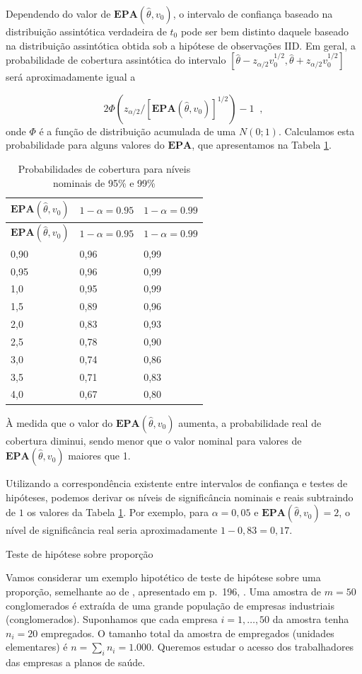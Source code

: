 \documentclass[]{book}
\theoremstyle{definition}
\theoremstyle{definition}
\theoremstyle{definition}
\theoremstyle{remark}
\let\BeginKnitrBlock\begin \let\EndKnitrBlock\end
\begin{document}
Dependendo do valor de \(\mathbf{EPA}\left( \hat{\theta},v_{0}\right)\),
o intervalo de confiança baseado na distribuição assintótica verdadeira
de \(t_{0}\) pode ser bem distinto daquele baseado na distribuição
assintótica obtida sob a hipótese de observações IID. Em geral, a
probabilidade de cobertura assintótica do intervalo
\(\left[\hat{\theta}-z_{\alpha /2}v_{0}^{1/2}, \hat{\theta}+z_{\alpha/2}v_{0}^{1/2}\right]\)
será aproximadamente igual a

\[
2\Phi \left( z_{\alpha /2}/\left[ \mathbf{EPA}\left( \hat{\theta}
,v_{0}\right) \right] ^{1/2}\right) -1\;\;, 
\] onde \(\Phi\) é a função de distribuição acumulada de uma
\(N\left( 0;1\right)\). Calculamos esta probabilidade para alguns
valores do \(\mathbf{EPA}\), que apresentamos na Tabela
\ref{tab:procob}.

\begin{longtable}[]{@{}lll@{}}
\caption{\label{tab:procob} Probabilidades de cobertura para níveis nominais
de 95\% e 99\%}\tabularnewline
\toprule
\(\mathbf{EPA}\left( \hat{\theta},v_{0}\right)\) & \(1-\alpha=0.95\) &
\(1-\alpha=0.99\)\tabularnewline
\midrule
\endfirsthead
\toprule
\(\mathbf{EPA}\left( \hat{\theta},v_{0}\right)\) & \(1-\alpha=0.95\) &
\(1-\alpha=0.99\)\tabularnewline
\midrule
\endhead
0,90 & 0,96 & 0,99\tabularnewline
0,95 & 0,96 & 0,99\tabularnewline
1,0 & 0,95 & 0,99\tabularnewline
1,5 & 0,89 & 0,96\tabularnewline
2,0 & 0,83 & 0,93\tabularnewline
2,5 & 0,78 & 0,90\tabularnewline
3,0 & 0,74 & 0,86\tabularnewline
3,5 & 0,71 & 0,83\tabularnewline
4,0 & 0,67 & 0,80\tabularnewline
\bottomrule
\end{longtable}

À medida que o valor do \(\mathbf{EPA}\left( \hat{\theta},v_{0}\right)\)
aumenta, a probabilidade real de cobertura diminui, sendo menor que o
valor nominal para valores de
\(\mathbf{EPA}\left( \hat{\theta},v_{0}\right)\) maiores que 1.

Utilizando a correspondência existente entre intervalos de confiança e
testes de hipóteses, podemos derivar os níveis de significância nominais
e reais subtraindo de \(1\) os valores da Tabela \ref{tab:procob}. Por
exemplo, para \(\alpha =0,05\) e
\(\mathbf{EPA}\left( \hat{\theta},v_{0}\right) =2\), o nível de
significância real seria aproximadamente \(1-0,83=0,17\).

\BeginKnitrBlock{example}
\protect\hypertarget{exm:exebin}{}{\label{exm:exebin} }Teste de hipótese
sobre proporção
\EndKnitrBlock{example} Vamos considerar um exemplo hipotético de teste
de hipótese sobre uma proporção, semelhante ao de \citep{Sud76},
apresentado em p.~196, \citep{lethonen}. Uma amostra de \(m=50\)
conglomerados é extraída de uma grande população de empresas industriais
(conglomerados). Suponhamos que cada empresa \(i=1,\ldots ,50\) da
amostra tenha \(n_{i}=20\) empregados. O tamanho total da amostra de
empregados (unidades elementares) é \(n=\sum_{i}n_{i}=1.000\). Queremos
estudar o acesso dos trabalhadores das empresas a planos de saúde.
\end{document}
